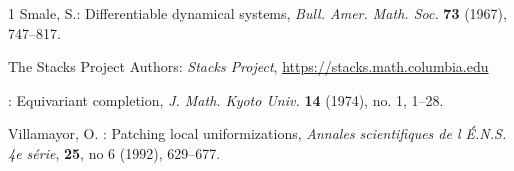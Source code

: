 \documentclass[12pt]{article}
\numberwithin{equation}{section}
\theoremstyle{remark}
\theoremstyle{definition}
\numberwithin{theorem}{section}
\renewcommand{\1}{\mathbbm{1}}
\begin{document}
\begin{thebibliography}{1}
 {\sc Smale, S.}:
Differentiable dynamical systems,
{\em Bull. Amer. Math. Soc.} {\bf 73} (1967), 747--817.

 {\sc The {Stacks Project Authors}}: {\em Stacks Project}, {\url{https://stacks.math.columbia.edu}}

:{ Equivariant completion}, {\em J. Math. Kyoto Univ.} {\bf 14 } (1974), no. 1, 1--28.

 {\sc Villamayor, O. }:
Patching local uniformizations, 
{\em Annales scientifiques de l \'E.N.S. 4e s\'erie},{ \bf 25}, no 6 (1992), 629--677.

\end{thebibliography}

    
    
\end{document}
